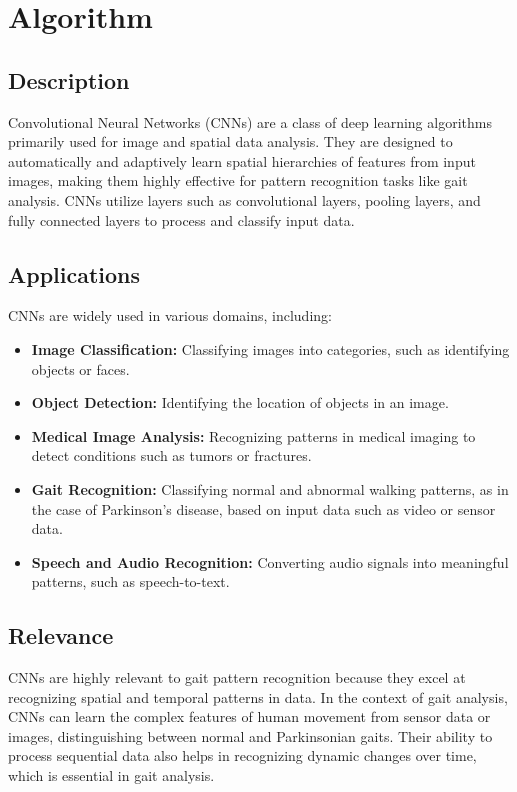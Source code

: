 %
%
%
%

\chapter{Algorithm}

\section{Description}
Convolutional Neural Networks (CNNs) are a class of deep learning algorithms primarily used for image and spatial data analysis. They are designed to automatically and adaptively learn spatial hierarchies of features from input images, making them highly effective for pattern recognition tasks like gait analysis. CNNs utilize layers such as convolutional layers, pooling layers, and fully connected layers to process and classify input data. \cite{TensorFlow:2023} 

\section{Applications}
CNNs are widely used in various domains, including:

\begin{itemize}
	\item \textbf{Image Classification:} Classifying images into categories, such as identifying objects or faces.
	\item \textbf{Object Detection:} Identifying the location of objects in an image.
	\item \textbf{Medical Image Analysis:} Recognizing patterns in medical imaging to detect conditions such as tumors or fractures.
	\item \textbf{Gait Recognition:} Classifying normal and abnormal walking patterns, as in the case of Parkinson’s disease, based on input data such as video or sensor data.
	\item \textbf{Speech and Audio Recognition:} Converting audio signals into meaningful patterns, such as speech-to-text.
\end{itemize}

\section{Relevance}
CNNs are highly relevant to gait pattern recognition because they excel at recognizing spatial and temporal patterns in data. In the context of gait analysis, CNNs can learn the complex features of human movement from sensor data or images, distinguishing between normal and Parkinsonian gaits. Their ability to process sequential data also helps in recognizing dynamic changes over time, which is essential in gait analysis.

